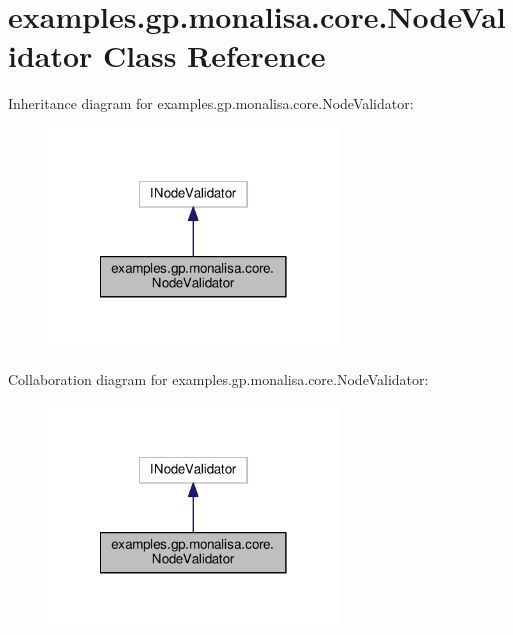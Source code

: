 \hypertarget{classexamples_1_1gp_1_1monalisa_1_1core_1_1_node_validator}{\section{examples.\-gp.\-monalisa.\-core.\-Node\-Validator Class Reference}
\label{classexamples_1_1gp_1_1monalisa_1_1core_1_1_node_validator}
}


Inheritance diagram for examples.\-gp.\-monalisa.\-core.\-Node\-Validator\-:
\nopagebreak
\begin{figure}[H]
\begin{center}
\leavevmode
\includegraphics[width=218pt]{classexamples_1_1gp_1_1monalisa_1_1core_1_1_node_validator__inherit__graph}
\end{center}
\end{figure}


Collaboration diagram for examples.\-gp.\-monalisa.\-core.\-Node\-Validator\-:
\nopagebreak
\begin{figure}[H]
\begin{center}
\leavevmode
\includegraphics[width=218pt]{classexamples_1_1gp_1_1monalisa_1_1core_1_1_node_validator__coll__graph}
\end{center}
\end{figure}
